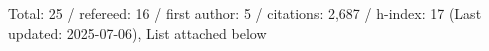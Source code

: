 Total: 25 / refereed: 16 / first author: 5 / citations: 2,687 / h-index: 17 (Last updated: 2025-07-06), List attached below